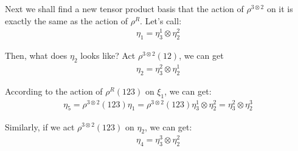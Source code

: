 \documentclass[]{ctexart}
\begin{document}
\begin{center}
\begin{tikzpicture}[x=0.75pt,y=0.75pt,yscale=-1,xscale=1]
		\end{tikzpicture}
		
	\end{center}

Next we shall find a new tensor product basis that the action of $\rho^{3\otimes2}$ on it is exactly the same as the action of $\rho^R$. Let's call:
	\begin{equation*}
	\begin{aligned}
		\eta_1=\eta_3^1\otimes \eta_2^2
	\end{aligned}
	\end{equation*}
	
Then, what does $\eta_2$ looks like? Act $\rho^{3\otimes2}(12)$, we can get
	\begin{equation*}
	\begin{aligned}
		\eta_2=\eta_3^2\otimes \eta_2^1
	\end{aligned}
	\end{equation*}
	
According to the action of $\rho^R(123)$ on $\xi_1$, we can get:
	\begin{equation*}
	\begin{aligned}
		\eta_5=\rho^{3\otimes2}(123)\eta_1=\rho^{3\otimes2}(123)\eta_3^1\otimes \eta_2^2=\eta_3^2\otimes \eta_2^3
	\end{aligned}
	\end{equation*}
	
Similarly, if we act $\rho^{3\otimes2}(123)$ on $\eta_2$, we can get:
	\begin{equation*}
	\begin{aligned}
		\eta_4=\eta_3^3\otimes \eta_2^2
	\end{aligned}
	\end{equation*}
	
\end{document}
